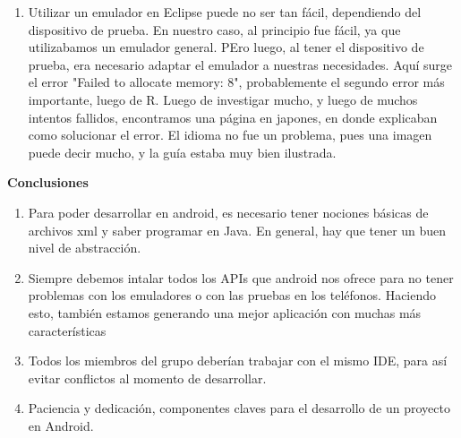 \documentclass[12pt]{report}
\begin{document}
\begin{enumerate}[--]
		\item Utilizar un emulador en Eclipse puede no ser tan fácil, dependiendo del dispositivo de prueba. En nuestro caso, al principio fue fácil, ya que utilizabamos un emulador general. PEro luego, al tener el dispositivo de prueba, era necesario adaptar el emulador a nuestras necesidades. Aquí surge el error "Failed to allocate memory: 8", probablemente el segundo error más importante, luego de R. \newline
\newline Luego de investigar mucho, y luego de muchos intentos fallidos, encontramos una página en japones, en donde explicaban como solucionar el error. El idioma no fue un problema, pues una imagen puede decir mucho, y la guía estaba muy bien ilustrada. 
\end {enumerate}


	\vspace{4em}
	
	\begingroup
		\large{
			\textbf{
				Conclusiones
				\newline
				\newline
			}
		}
	\endgroup

		\begin{enumerate}[1]%
		\item Para poder desarrollar en android, es necesario tener nociones básicas de archivos xml y saber programar en Java. En general, hay que tener un buen nivel de abstracción.
		\item Siempre debemos intalar todos los APIs que android nos ofrece para no tener problemas con los emuladores o con las pruebas en los teléfonos. Haciendo esto, también estamos generando una mejor aplicación con muchas más características
		\item Todos los miembros del grupo deberían trabajar con el mismo IDE, para así evitar conflictos al momento de desarrollar.
		\item Paciencia y dedicación, componentes claves para el desarrollo de un proyecto en Android.
		\end{enumerate}


	
\end{document}
